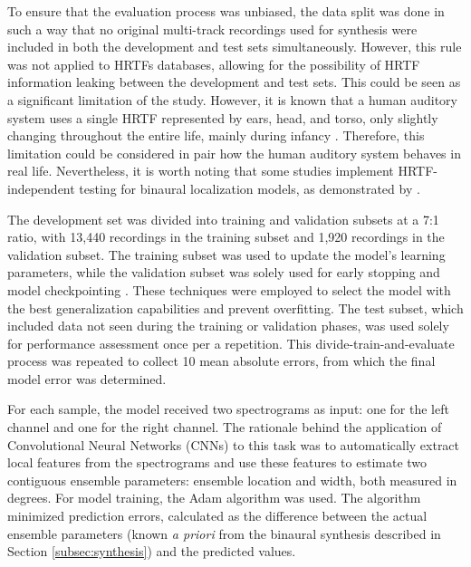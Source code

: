 \documentclass[11pt]{article}
\begin{document}
To ensure that the evaluation process was unbiased, the data split was done in such a way that no original multi-track recordings used for synthesis were included in both the development and test sets simultaneously. However, this rule was not applied to HRTFs databases, allowing for the possibility of HRTF information leaking between the development and test sets. This could be seen as a significant limitation of the study. However, it is known that a human auditory system uses a single HRTF represented by ears, head, and torso, only slightly changing throughout the entire life, mainly during infancy \parencite{clifton_growth_1988, king_how_2001}. Therefore, this limitation could be considered in pair how the human auditory system behaves in real life. Nevertheless, it is worth noting that some studies implement HRTF-independent testing for binaural localization models, as demonstrated by \textcite{zielinski_spatial_2022, zielinski_automatic_2022,antoniuk_blind_2023}.

The development set was divided into training and validation subsets at a 7:1 ratio, with 13,440 recordings in the training subset and 1,920 recordings in the validation subset. The training subset was used to update the model's learning parameters, while the validation subset was solely used for early stopping \parencite{pocock_practical_1989, morgan_generalization_1989} and model checkpointing \parencite{eisenman_check-n-run_2020}. These techniques were employed to select the model with the best generalization capabilities and prevent overfitting. The test subset, which included data not seen during the training or validation phases, was used solely for performance assessment once per a repetition. This divide-train-and-evaluate process was repeated to collect 10 mean absolute errors, from which the final model error was determined.

For each sample, the model received two spectrograms as input: one for the left channel and one for the right channel. The rationale behind the application of Convolutional Neural Networks (CNNs) to this task was to automatically extract local features from the spectrograms and use these features to estimate two contiguous ensemble parameters: ensemble location and width, both measured in degrees. For model training, the Adam algorithm \parencite{kingma_adam_2014} was used. The algorithm minimized prediction errors, calculated as the difference between the actual ensemble parameters (known \textit{a priori} from the binaural synthesis described in Section \ref{subsec:synthesis}) and the predicted values.
\end{document}
